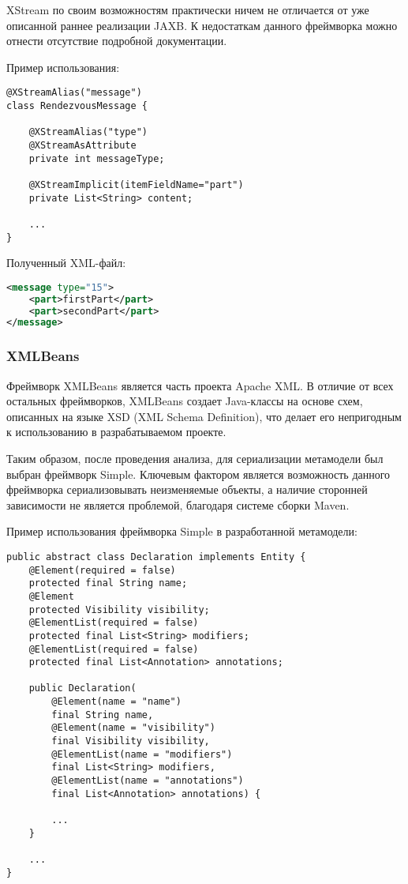 XStream по своим возможностям практически ничем не отличается от уже описанной
раннее реализации JAXB. К недостаткам данного фреймворка можно отнести
отсутствие подробной документации.

Пример использования:

\begin{lstlisting}[caption={Пример использования фреймворка XStream}]
@XStreamAlias("message")
class RendezvousMessage {

    @XStreamAlias("type")
    @XStreamAsAttribute
    private int messageType;

    @XStreamImplicit(itemFieldName="part")
    private List<String> content;

    ...
}
\end{lstlisting}

Полученный XML-файл:

\begin{lstlisting}[language=xml, caption={Полученный XML-файл}]
<message type="15">
    <part>firstPart</part>
    <part>secondPart</part>
</message>
\end{lstlisting}

\subsubsection{XMLBeans}


Фреймворк XMLBeans является часть проекта Apache XML. В отличие от всех
остальных фреймворков, XMLBeans создает Java-классы на основе схем, описанных на
языке XSD (XML Schema Definition), что делает его непригодным к использованию
в разрабатываемом проекте.

Таким образом, после проведения анализа, для сериализации метамодели был выбран
фреймворк Simple. Ключевым фактором является возможность данного фреймворка
сериализовывать неизменяемые объекты, а наличие сторонней зависимости не
является проблемой, благодаря системе сборки Maven.

Пример использования фреймворка Simple в разработанной метамодели:

\begin{lstlisting}[caption={Пример использования фреймворка Simple в метамодели}]
public abstract class Declaration implements Entity {
    @Element(required = false)
    protected final String name;
    @Element
    protected Visibility visibility;
    @ElementList(required = false)
    protected final List<String> modifiers;
    @ElementList(required = false)
    protected final List<Annotation> annotations;

    public Declaration(
        @Element(name = "name")
        final String name,
        @Element(name = "visibility")
        final Visibility visibility,
        @ElementList(name = "modifiers")
        final List<String> modifiers,
        @ElementList(name = "annotations")
        final List<Annotation> annotations) {

        ...
    }

    ...
}
\end{lstlisting}

